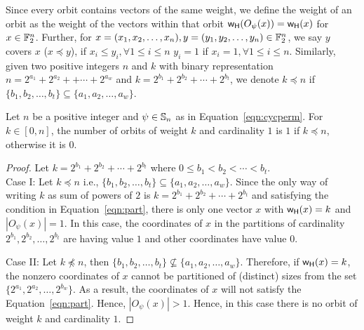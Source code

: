 \documentclass{llncs}
\begin{document}
\iffalse
\begin{proof}
For a vector $x \in \F_2^n$ is having an orbit of cardinality $1$ i.e., $|O_\psi(x)| = 1$ if and only if the coordinates of $x$ present in the cycles are of same value i.e., 
\begin{align}\label{eqn:part}
 & x_1  = x_2 = \ldots = x_{n_1}; \nonumber\\
 & x_{n_1+1}  = x_{n_1+2} = \ldots = x_{n_1+n_2}; \nonumber\\
& \vdots \\
 & x_{n-n_w+1}  = x_{n-n_w+2} = \ldots = x_n. \nonumber
\end{align}
As each partition of coordinates can be either $0$ or $1$, there are $2^w$ vectors $x$ in $\F_2^n$ satisfying Equation~\ref{eqn:part} and hence $|O_\psi(x)| = 1$.
\end{proof}
\fi
Since every orbit contains vectors of the same weight, we define the weight of an orbit as the weight of the vectors within that orbit \ie $\mathsf{w_H}(O_\psi(x)) = \mathsf{w_H}(x)$ for $x \in \F_2^n$. Further, for $x = (x_1, x_2,\ldots, x_n), y = (y_1, y_2, \ldots, y_n) \in \mathbb{F}_2^n$, we say $y$ covers $x$ (\ie $x \preceq y $), if $x_{i} \leq y_{i}, \forall 1 \leq i \leq n$ \ie $y_i = 1$ if $x_i = 1, \forall 1 \leq i \leq n$.
Similarly, given two positive integers $n$ and $k$ with binary representation $n = 2^{a_1} + 2^{a_2} + + \cdots + 2^{a_w}$ and $k = 2^{b_1}+ 2^{b_2} + \cdots + 2^{b_t}$, we denote $k \preceq n$ if $\{b_1, b_2, \ldots, b_t\} \subseteq \{a_1, a_2, \ldots, a_w\}$.
\begin{lemma}
Let $n$ be a positive integer and $\psi \in \mathbb{S}_n$ as in Equation~\ref{eqn:cycperm}. For $k \in [0,n]$, the number of orbits of weight $k$ and cardinality $1$ is $1$ if $k \preceq n$, otherwise it is $0$.
\end{lemma}
\iffalse
\begin{proof}
Let $k = 2^{b_1}+ 2^{b_2} + \cdots + 2^{b_t}$ where $0 \leq b_1 < b_2 < \cdots < b_t$.\\
Case I: Let $k \preceq n$ i.e., $\{b_1, b_2, \ldots, b_t\} \subseteq \{a_1, a_2, \ldots, a_w\}$. Since the only way of writing $k$ as sum of powers of $2$ is $k = 2^{b_1}+ 2^{b_2} + \cdots + 2^{b_t}$ and satisfying the condition in Equation~\ref{eqn:part}, there is only one vector $x$ with $\mathsf{w_H}(x) = k$ and $|O_\psi(x)| = 1$. In this case, the coordinates of $x$ in the partitions of cardinality $2^{b_1}, 2^{b_2}, \ldots, 2^{b_t}$ are having value $1$ and other coordinates have value $0$.

\noindent Case II: Let $k \not\preceq n$, then $\{b_1, b_2, \ldots, b_t\} \not \subseteq \{a_1, a_2, \ldots, a_w\}$. Therefore, if $\mathsf{w_H}(x) = k$, the nonzero coordinates of $x$ cannot be partitioned of (distinct) sizes from the set $\{2^{a_1}, 2^{a_2}, \ldots, 2^{b_w}\}$.
As a result, the coordinates of $x$ will not satisfy the Equation~\ref{eqn:part}. Hence,
$|O_\psi(x)| > 1$. Hence, in this case there is no orbit of weight $k$ and cardinality $1$.
\end{proof}
\end{document}
